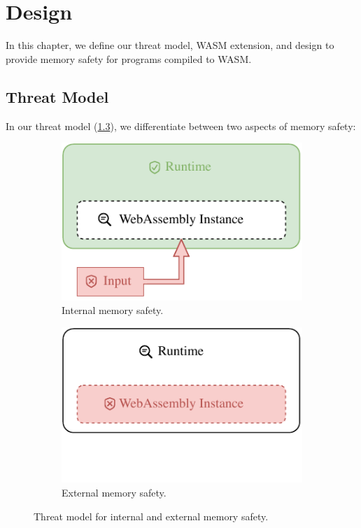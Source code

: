 \chapter{Design}
\label{ch:design}

In this chapter, we define our threat model, \ac{WASM} extension, and design to provide memory safety for programs compiled to \ac{WASM}.

\section{Threat Model}
\label{sec:threat-model}

In our threat model (\cref{fig:threat-model}), we differentiate between two aspects of memory safety:

\begin{figure}
    \centering
    \begin{subfigure}[T]{0.45\textwidth}
        \centering
        \includegraphics{figures/build/wasm-internal-mem-safety}
        \caption{Internal memory safety.}
        \label{fig:internal-mem-safety}
    \end{subfigure}
    \hfill
    \begin{subfigure}[T]{0.45\textwidth}
        \centering
        \includegraphics{figures/build/wasm-external-mem-safety}
        \hspace{\fill}
        \caption{External memory safety.}
        \label{fig:external-mem-safety}
    \end{subfigure}
    \caption{Threat model for internal and external memory safety.}
    \label{fig:threat-model}
\end{figure}

